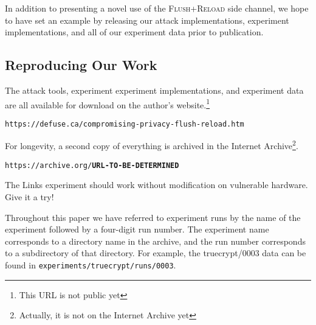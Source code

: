 \documentclass{acm_proc_article-sp}
\begin{document}
In addition to presenting a novel use of the \textsc{Flush+Reload} side channel, we hope
to have set an example by releasing our attack implementations, experiment
implementations, and all of our experiment data prior to publication.




\begin{appendices}
    \section{Reproducing Our Work}
    \label{sec:reproducing}

    The attack tools, experiment experiment implementations, and experiment data
    are all available for download on the author's website.\footnote{This
    URL is not public yet}

    \texttt{https://defuse.ca/compromising-privacy-flush-reload.htm}

    For longevity, a second copy of everything is archived in the Internet
    Archive\footnote{Actually, it is not on the Internet Archive yet}.

    \texttt{https://archive.org/\textbf{URL-TO-BE-DETERMINED}}

    The Links experiment should work without modification on vulnerable
    hardware. Give it a try!

    Throughout this paper we have referred to experiment runs by the name of the
    experiment followed by a four-digit run number. The experiment name
    corresponds to a directory name in the archive, and the run number
    corresponds to a subdirectory of that directory. For example, the
    truecrypt/0003 data can be found in
    \texttt{experiments/truecrypt/runs/0003}.
\end{appendices}
\end{document}
